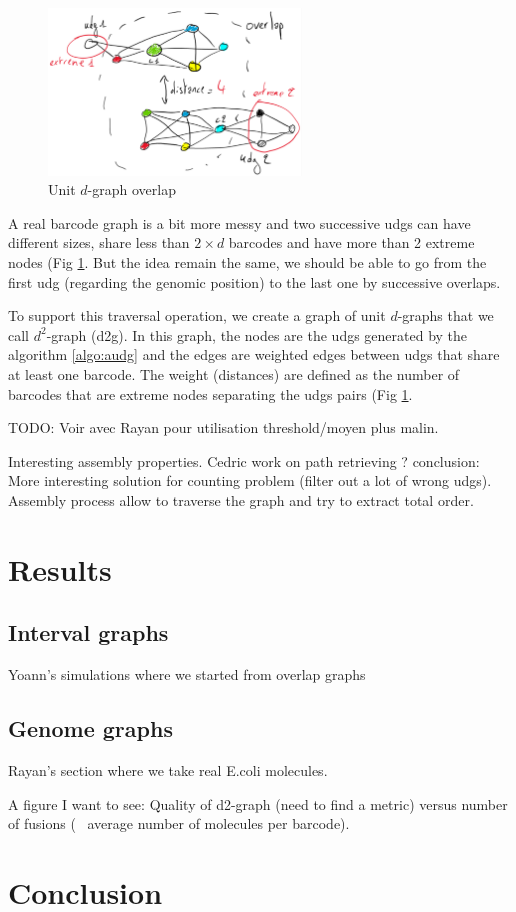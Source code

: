 \documentclass{article}
\begin{document}
\begin{figure}[htp]
    \centering
    \includegraphics[width=0.6\textwidth]{overlap.pdf}
    \caption{Unit $d$-graph overlap}
    \label{fig:overlap}
\end{figure}

A real barcode graph is a bit more messy and two successive udgs can have different sizes, share less than $2 \times d$ barcodes and have more than 2 extreme nodes (Fig \ref{fig:overlap}.
But the idea remain the same, we should be able to go from the first udg (regarding the genomic position) to the last one by successive overlaps.

To support this traversal operation, we create a graph of unit $d$-graphs that we call $d^2$-graph (d2g).
In this graph, the nodes are the udgs generated by the algorithm \ref{algo:audg} and the edges are weighted edges between udgs that share at least one barcode.
The weight (distances) are defined as the number of barcodes that are extreme nodes separating the udgs pairs (Fig \ref{fig:overlap}.

TODO: Voir avec Rayan pour utilisation threshold/moyen plus malin.


Interesting assembly properties.
Cedric work on path retrieving ?
conclusion: More interesting solution for counting problem (filter out a lot of wrong udgs).
Assembly process allow to traverse the graph and try to extract total order.

\section{Results}

\subsection{Interval graphs}

Yoann's simulations where we started from overlap graphs

\subsection{Genome graphs}

Rayan's section where we take real E.coli molecules.

A figure I want to see: Quality of d2-graph (need to find a metric) versus number of fusions (~ average number of molecules per barcode).

\section{Conclusion}
\end{document}
